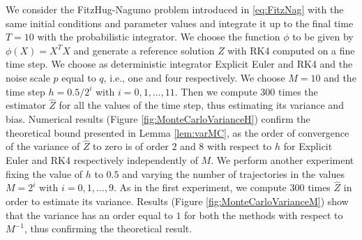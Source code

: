 We consider the FitzHug-Nagumo problem introduced in \eqref{eq:FitzNag} with the same initial conditions and parameter values and integrate it up to the final time $T = 10$ with the probabilistic integrator. We choose the function $\phi$ to be given by $\phi(X) = X^TX$ and generate a reference solution $Z$ with RK4 computed on a fine time step. We choose as deterministic integrator Explicit Euler and RK4 and the noise scale $p$ equal to $q$, i.e., one and four respectively. We choose $M = 10$ and the time step $h = 0.5 / 2^i$ with $i = 0, 1, \ldots, 11$. Then we compute $300$ times the estimator $\hat Z$ for all the values of the time step, thus estimating its variance and bias. Numerical results (Figure \ref{fig:MonteCarloVarianceH}) confirm the theoretical bound presented in Lemma \ref{lem:varMC}, as the order of convergence of the variance of $\hat{Z}$ to zero is of order $2$ and $8$ with respect to $h$ for Explicit Euler and RK4 respectively independently of $M$. We perform another experiment fixing the value of $h$ to $0.5$ and varying the number of trajectories in the values $M = 2^i$ with $i = 0, 1, \ldots, 9$. As in the first experiment, we compute 300 times $\hat Z$ in order to estimate its variance. Results (Figure \ref{fig:MonteCarloVarianceM}) show that the variance has an order equal to $1$ for both the methods with respect to $M^{-1}$, thus confirming the theoretical result.


